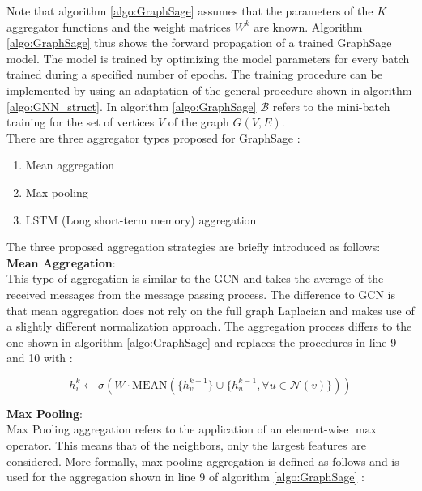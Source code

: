 	\noindent Note that algorithm \ref{algo:GraphSage} assumes that the
	parameters of the $K$ aggregator functions and the weight matrices $W^{k}$
	are known. Algorithm \ref{algo:GraphSage} thus shows the forward
	propagation of a trained GraphSage model. The model is trained by
	optimizing the model parameters for every batch trained during a specified 
	number of epochs. The training procedure can be implemented by using an
	adaptation of the general procedure shown in algorithm 
	\ref{algo:GNN_struct}. In algorithm \ref{algo:GraphSage} $\mathcal{B}$ 
	refers to the mini-batch training for the set of vertices $V$ of the graph 
	$G(V,E)$. \\

	\noindent There are three aggregator types proposed for GraphSage
	\citep{hamilton2017inductive}:

	\begin{enumerate}
		\item Mean aggregation
		\item Max pooling
		\item LSTM (Long short-term memory) aggregation
	\end{enumerate}

	\noindent The three proposed aggregation strategies are briefly introduced
	as follows: \\

	\noindent\textbf{Mean Aggregation}:\\
	\noindent This type of aggregation is similar to the GCN and takes the
	average of the received messages from the message passing process. The 
	difference to GCN is that mean aggregation does not rely on the full graph 
	Laplacian and makes use of a slightly different normalization approach. The 
	aggregation process differs to the one shown in algorithm 
	\ref{algo:GraphSage} and replaces the procedures in line 9 and 10 with 
	\citep[p. 5]{hamilton2017inductive}:

	\begin{equation}
		h_{v}^{k} \leftarrow \sigma\left(W\cdot
		\text{MEAN}(\{h_{v}^{k-1}\}\cup\{h_{u}^{k-1},\forall u \in \mathcal{N}(v)\})\right)
	\end{equation}

	\noindent\textbf{Max Pooling}:\\
	\noindent Max Pooling aggregation refers to the application of an 
	element-wise $\max$ operator. This means 
	that of the neighbors, only the largest features are considered. More 
	formally, max pooling aggregation is defined as follows and is used for the
	aggregation shown in line 9 of algorithm \ref{algo:GraphSage} 
	\citep[p. 6]{hamilton2017inductive}:

